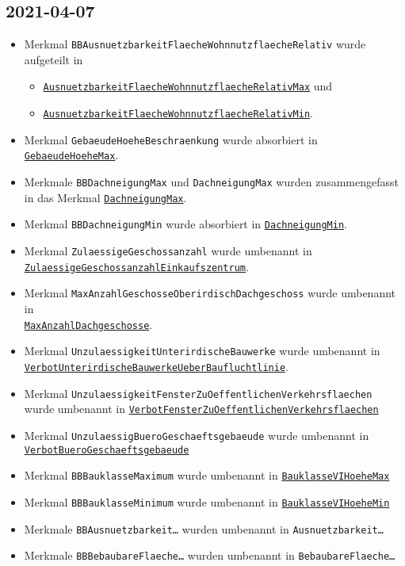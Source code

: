 \documentclass{article}
\newcommand{\mml}[1]{\texttt{#1}}
\newcommand{\merkmalref}[1]{\hyperref[merkmal:#1]{\mml{#1}}}
\begin{document}
\subsection{2021-04-07}
\begin{itemize}
\item Merkmal \mml{BBAusnuetzbarkeitFlaecheWohnnutzflaecheRelativ}
  wurde aufgeteilt in
  \begin{itemize}
  \item \merkmalref{AusnuetzbarkeitFlaecheWohnnutzflaecheRelativMax}
    und 
  \item \merkmalref{AusnuetzbarkeitFlaecheWohnnutzflaecheRelativMin}.
  \end{itemize}
\item Merkmal \mml{GebaeudeHoeheBeschraenkung} wurde absorbiert in \merkmalref{GebaeudeHoeheMax}.
\item Merkmale \mml{BBDachneigungMax} und \mml{DachneigungMax} wurden
  zusammengefasst in das Merkmal \merkmalref{DachneigungMax}.
\item Merkmal \mml{BBDachneigungMin} wurde absorbiert in \merkmalref{DachneigungMin}.
\item Merkmal \mml{ZulaessigeGeschossanzahl} wurde umbenannt in\\ \merkmalref{ZulaessigeGeschossanzahlEinkaufszentrum}.
\item Merkmal \mml{MaxAnzahlGeschosseOberirdischDachgeschoss} wurde umbenannt in\\ \merkmalref{MaxAnzahlDachgeschosse}.
\item Merkmal \mml{UnzulaessigkeitUnterirdischeBauwerke} wurde umbenannt in\\ \merkmalref{VerbotUnterirdischeBauwerkeUeberBaufluchtlinie}.
\item Merkmal
  \mml{UnzulaessigkeitFensterZuOeffentlichenVerkehrsflaechen} wurde
  umbenannt in \merkmalref{VerbotFensterZuOeffentlichenVerkehrsflaechen}
\item Merkmal \mml{UnzulaessigBueroGeschaeftsgebaeude} wurde umbenannt
  in\\ \merkmalref{VerbotBueroGeschaeftsgebaeude}
\item Merkmal \mml{BBBauklasseMaximum} wurde umbenannt in \merkmalref{BauklasseVIHoeheMax}
\item Merkmal \mml{BBBauklasseMinimum} wurde umbenannt in
  \merkmalref{BauklasseVIHoeheMin}
\item Merkmale \mml{BBAusnuetzbarkeit\dots} wurden umbenannt in \mml{Ausnuetzbarkeit\dots}
\item Merkmale \mml{BBBebaubareFlaeche\dots} wurden umbenannt in \mml{BebaubareFlaeche\dots}
\end{itemize}
\end{document}
